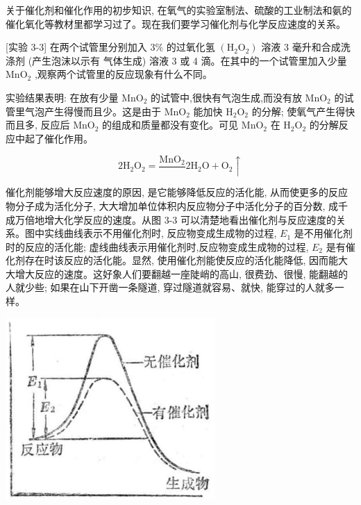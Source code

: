 \documentclass[10pt]{article}
\begin{document}
关于催化剂和催化作用的初步知识, 在氧气的实验室制法、硫酸的工业制法和氨的催化氧化等教材里都学习过了。现在我们要学习催化剂与化学反应速度的关系。

[实验 3-3] 在两个试管里分别加入 \(3\%\) 的过氧化氢 \(\left( {{\mathrm{H}}_{2}{\mathrm{O}}_{2}}\right)\) 溶液 3 毫升和合成洗涤剂 (产生泡沫以示有 气体生成) 溶液 3 或 4 滴。在其中的一个试管里加入少量 \({\mathrm{{MnO}}}_{2}\) ,观察两个试管里的反应现象有什么不同。

实验结果表明: 在放有少量 \({\mathrm{{MnO}}}_{2}\) 的试管中,很快有气泡生成,而没有放 \({\mathrm{{MnO}}}_{2}\) 的试管里气泡产生得慢而且少。这是由于 \({\mathrm{{MnO}}}_{2}\) 能加快 \({\mathrm{H}}_{2}{\mathrm{O}}_{2}\) 的分解; 使氧气产生得快而且多, 反应后 \({\mathrm{{MnO}}}_{2}\) 的组成和质量都没有变化。可见 \({\mathrm{{MnO}}}_{2}\) 在 \({\mathrm{H}}_{2}{\mathrm{O}}_{2}\) 的分解反应中起了催化作用。

\[
2{\mathrm{H}}_{2}{\mathrm{O}}_{2} = \frac{{\mathrm{{MnO}}}_{2}}{}2{\mathrm{H}}_{2}\mathrm{O} + {\mathrm{O}}_{2} \uparrow
\]

催化剂能够增大反应速度的原因, 是它能够降低反应的活化能, 从而使更多的反应物分子成为活化分子, 大大增加单位体积内反应物分子中活化分子的百分数, 成千成万倍地增大化学反应的速度。从图 3-3 可以清楚地看出催化剂与反应速度的关系。图中实线曲线表示不用催化剂时, 反应物变成生成物的过程, \({E}_{1}\) 是不用催化剂时的反应的活化能; 虚线曲线表示用催化剂时,反应物变成生成物的过程, \({E}_{2}\) 是有催化剂存在时该反应的活化能。显然, 使用催化剂能使反应的活化能降低, 因而能大大增大反应的速度。这好象人们要翻越一座陡峭的高山, 很费劲、很慢, 能翻越的人就少些; 如果在山下开凿一条隧道, 穿过隧道就容易、就快, 能穿过的人就多一样。

\begin{center}
\includegraphics[max width=0.6\textwidth]{images/01912d13-9986-7822-a012-3f3f7be99dcb_72_684597.jpg}
\end{center}
\end{document}
